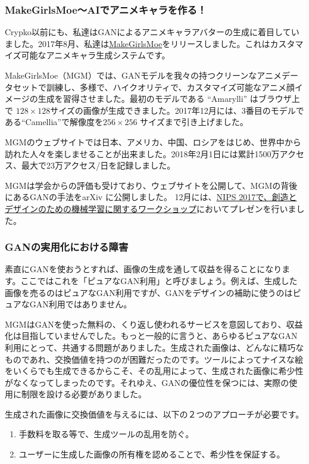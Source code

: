 \documentclass[xelatex,ja=standard]{bxjsarticle}
\begin{document}
\subsubsection{MakeGirlsMoe〜AIでアニメキャラを作る！}
Crypko以前にも、私達はGANによるアニメキャラアバターの生成に着目していました。2017年8月、私達は\href{http://make.girls.moe/#/}{MakeGirlsMoe}をリリースしました。これはカスタマイズ可能なアニメキャラ生成システムです。

MakeGirlsMoe（MGM）では、GANモデルを我々の持つクリーンなアニメデータセットで訓練し、多様で、ハイクオリティで、カスタマイズ可能なアニメ顔イメージの生成を習得させました。最初のモデルである ``Amarylli'' はブラウザ上で $128 \times 128$サイズの画像が生成できました。2017年12月には、3番目のモデルである``Camellia''で解像度を$256 \times 256$ サイズまで引き上げました。

MGMのウェブサイトでは日本、アメリカ、中国、ロシアをはじめ、世界中から訪れた人々を楽しませることが出来ました。2018年2月1日には累計1500万アクセス、最大で23万アクセス/日を記録しました。

MGMは学会からの評価も受けており、ウェブサイトを公開して、MGMの背後にあるGANの手法をarXiv\cite{jin2017towards} に公開しました。 12月には、\href{https://nips2017creativity.github.io/}{NIPS 2017で、創造とデザインのための機械学習に関するワークショップ}においてプレゼンを行いました。

\subsubsection{GANの実用化における障害}

素直にGANを使おうとすれば、画像の生成を通して収益を得ることになります。ここではこれを「ピュアなGAN利用」と呼びましょう。例えば、生成した画像を売るのはピュアなGAN利用ですが、GANをデザインの補助に使うのはピュアなGAN利用ではありません。

MGMはGANを使った無料の、くり返し使われるサービスを意図しており、収益化は目指していませんでした。もっと一般的に言うと、あらゆるピュアなGAN利用にとって、共通する問題がありました。生成された画像は、どんなに精巧なものであれ、交換価値を持つのが困難だったのです。ツールによってナイスな絵をいくらでも生成できるからこそ、その乱用によって、生成された画像に希少性がなくなってしまったのです。それゆえ、GANの優位性を保つには、実際の使用に制限を設ける必要がありました。

生成された画像に交換価値を与えるには、以下の２つのアプローチが必要です。

\begin{enumerate}
\item 手数料を取る等で、生成ツールの乱用を防ぐ。
\item ユーザーに生成した画像の所有権を認めることで、希少性を保証する。
\end{enumerate}
\end{document}
